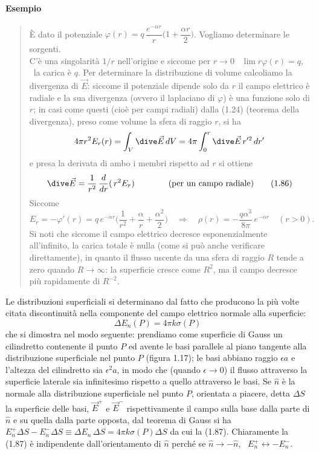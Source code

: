 \paragraph{Esempio}
\begin{quote}
È dato il potenziale $\varphi(r)=q\,\dfrac{e^{-\alpha r}}{r}\Big(1+\dfrac{\alpha r}{2}\Big)$. Vogliamo determinare le sorgenti.\\
C'è una singolarità $1/r$ nell'origine e siccome per $r\to0$ \ $\lim r\varphi(r)=q$, \ la carica è $q$. Per determinare la distribuzione di volume calcoliamo la divergenza di $\vec E$: siccome il potenziale dipende solo da $r$ il campo elettrico è radiale e la sua divergenza (ovvero il laplaciano di $\varphi$) è una funzione solo di $r$; in casi come questi (cioè per campi radiali) dalla (1.24) (teorema della divergenza), preso come volume la sfera di raggio $r$, si ha
\[
4\pi r^2E_r(r)=\int_V\dive\vec E\,dV=4\pi\int_0^r\dive\vec E\,r'^2\,dr'
\]
e presa la derivata di ambo i membri rispetto ad $r$ si ottiene
\begin{equation}
\dive\vec E=\frac{1}{r^2}\,\frac{d}{dr}(\,r^2E_r)\qquad\qquad\text{(per un campo radiale)}
\tag{1.86}
\end{equation}
Siccome
\[
E_r=-\varphi'(r)=q\,e^{-\alpha r}\Big(\frac{1}{r^2}+\frac\alpha r+\frac{\alpha^2}{2}\Big)\quad\Rightarrow\quad\rho(r)=-\frac{q\alpha^3}{8\pi}\,e^{-\alpha r}\quad(r>0).
\]
Si noti che siccome il campo elettrico decresce esponenzialmente all'infinito, la carica totale è nulla (come si può anche verificare direttamente), in quanto il flusso uscente da una sfera di raggio $R$ tende a zero quando $R\to\infty$: la superficie cresce come $R^2$, ma il campo decresce più rapidamente di $R^{-2}$.
\end{quote}
Le distribuzioni superficiali si determinano dal fatto che producono la più volte citata discontinuità nella componente del campo elettrico normale alla superficie:
\begin{equation}
\Delta E_n(P)=4\pi k\sigma(P)
\tag{1.87}
\end{equation}
che si dimostra nel modo seguente: prendiamo come superficie di Gauss un cilindretto contenente il punto $P$ ed avente le basi parallele al piano tangente alla distribuzione superficiale nel punto $P$ (figura 1.17); le basi abbiano raggio $\epsilon a$ e l'altezza del cilindretto sia $\epsilon^2a$, in modo che (quando $\epsilon\to0$) il flusso attraverso la superficie laterale sia infinitesimo rispetto a quello attraverso le basi. Se $\hat n$ è la normale alla distribuzione superficiale nel punto $P$, orientata a piacere, detta $\Delta S$ la superficie delle basi, $\vec E^+$ e $\vec E^-$ rispettivamente il campo sulla base dalla parte di $\hat n$ e su quella dalla parte opposta, dal teorema di Gauss si ha $E_n^+\Delta S-E_n^-\Delta S\equiv\Delta E_n\,\Delta S=4\pi k\sigma(P)\Delta S$ da cui la (1.87). Chiaramente la (1.87) è indipendente dall'orientamento di $\hat n$ perché se $\hat n\to-\hat n$, \ $E_n^+\leftrightarrow-E_n^-$.
